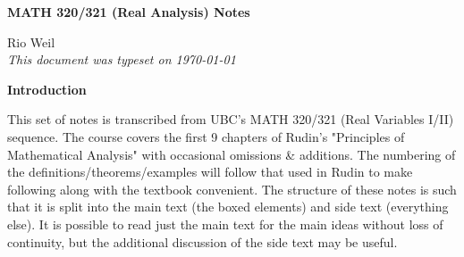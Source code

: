 \documentclass[10pt]{article}
\begin{document}
\begin{tcolorbox}
  \begin{center}
  \begin{Large}
    \textbf{MATH 320/321 (Real Analysis) Notes} \\
    \vspace{5pt}
  \end{Large}
  \begin{large}
        Rio Weil \\
\vspace{5pt}
    \emph{This document was typeset on \today}
  \end{large}
  \end{center}
\end{tcolorbox}

\begin{center}
  \textbf{Introduction}
  
  This set of notes is transcribed from UBC's MATH 320/321 (Real Variables I/II) sequence. The course covers the first 9 chapters of Rudin's "Principles of Mathematical Analysis" with occasional omissions \& additions. The numbering of the definitions/theorems/examples will follow that used in Rudin to make following along with the textbook convenient. The structure of these notes is such that it is split into the main text (the boxed elements) and side text (everything else). It is possible to read just the main text for the main ideas without loss of continuity, but the additional discussion of the side text may be useful.
\end{center}
\tableofcontents

\newpage










\end{document}
